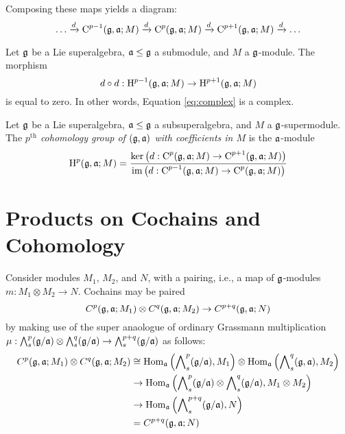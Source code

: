 Composing these maps yields a diagram:
\begin{equation}\label{eq:complex}
  \ldots \xrightarrow{d} \C^{p-1}(\g,\a;M) \xrightarrow{d} \C^p(\g,\a;M) \xrightarrow{d} \C^{p+1}(\g,\a;M) \xrightarrow{d} \ldots
\end{equation}

\begin{proposition}
  Let $\g$ be a Lie superalgebra, $\a \leq \g$ a submodule, and $M$ a $\g$-module. The morphism
  \[
    d \circ d : \H^{p-1}(\g,\a;M) \to \H^{p+1}(\g,\a;M)
  \]
  is equal to zero. In other words, Equation \ref{eq:complex} is a complex.
\end{proposition}

\begin{definition}
  Let $\g$ be a Lie superalgebra, $\a \leq \g$ a subsuperalgebra, and $M$ a $\g$-supermodule. The \emph{$p^\text{th}$ cohomology group of $(\g,\a)$ with coefficients in $M$} is the $\a$-module
  \[
    \H^p(\g,\a;M) = \frac{\ker\left(d:\C^p(\g,\a;M) \to \C^{p+1}(\g,\a;M)\right)}{\im \left(d:\C^{p-1}(\g,\a;M) \to \C^{p}(\g,\a;M)\right)}
  \]
  
\end{definition}

\section{Products on Cochains and Cohomology}
\label{sec:products}

Consider modules $M_1$, $M_2$, and $N$, with a pairing, i.e., a map of $\g$-modules $m:M_1 \otimes M_2 \to N$. Cochains may be paired
\[
  C^p(\g,\a;M_1) \otimes C^q(\g,\a;M_2) \to C^{p+q}(\g,\a;N)
\]
by making use of the super anaologue of ordinary Grassmann multiplication $\mu: \superext{p}(\g/\a) \otimes \superext{q}(\g/\a) \to \superext{p+q}(\g/\a)$ as follows:
\begin{align}
  \begin{split}
    C^p(\g,\a;M_1) \otimes C^q(\g,\a;M_2) &\cong \Hom_\a\left(\superext{p}(\g/\a),M_1\right) \otimes \Hom_\a\left(\superext{q}(\g,\a),M_2\right) \\
    & \to \Hom_\a\left( \superext{p}(\g/\a) \otimes \superext{q}(\g/\a), M_1 \otimes M_2 \right) \\
    & \to \Hom_\a\left( \superext{p+q}(\g/\a), N\right) \\
    &= C^{p+q}(\g,\a;N)
  \end{split}
\end{align}

